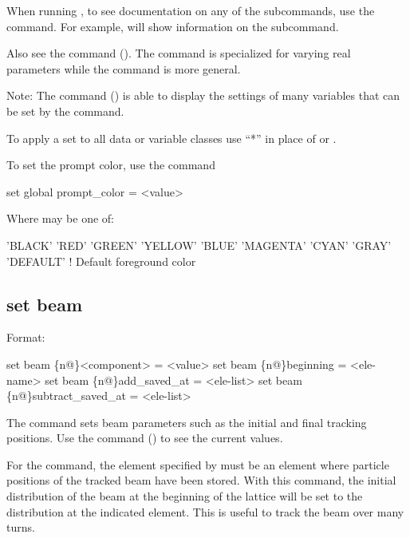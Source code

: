 {{When running \tao, to see documentation on any of the subcommands, use the  command. For example,  will show information on the  subcommand.

Also see the  command (). The  command is specialized
for varying real parameters while the  command is more general.

Note: The  command () is able to display the settings of many variables
that can be set by the  command.

To apply a set to all data or variable classes use ``*'' in place of  or
.

To set the prompt color, use the command
\begin{example}
  set global prompt_color = <value>
\end{example}
Where  may be one of:
\begin{example}
  'BLACK'
  'RED'
  'GREEN'
  'YELLOW'
  'BLUE'
  'MAGENTA'
  'CYAN'
  'GRAY'
  'DEFAULT'       ! Default foreground color
\end{example}



\subsection{set beam}
\label{s:set.beam}

Format:
\begin{example}
  set beam \{n@\}<component> = <value>
  set beam \{n@\}beginning = <ele-name>
  set beam \{n@\}add_saved_at = <ele-list>
  set beam \{n@\}subtract_saved_at = <ele-list>
\end{example}

The  command sets beam parameters such as the initial and final tracking positions.
Use the  command () to see the current values.

For the  command, the element specified by  must be
an element where particle positions of the tracked beam have been stored. With this command, the initial
distribution of the beam at the beginning of the lattice will be set to the distribution at the indicated
element. This is useful to track the beam over many turns.

}}
